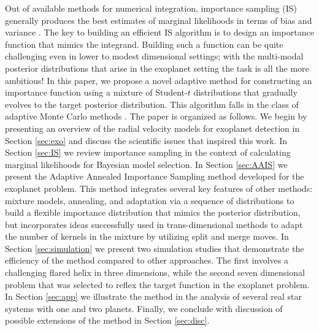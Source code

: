 Out of available methods for numerical integration, importance
sampling (IS) generally produces the best estimates of marginal
likelihoods in terms of bias and variance . The key to building an efficient IS algorithm is to
design an importance function that mimics the integrand.  Building
such a function can be quite challenging even in lower to modest
dimensional settings; with the multi-modal posterior distributions
that arise in the exoplanet setting the task is all the more
ambitious!  In this paper, we propose a novel adaptive method for
constructing an importance function using a mixture of Student-$t$
distributions that gradually evolves to the target posterior
distribution.  This algorithm falls in the class of adaptive  Monte
Carlo methods \citep[see][for an overview and papers appearing in the
special issue on sequential Monte Carlo]{fern:2008}.  The paper is organized as
follows.   We begin by
presenting an overview of the radial velocity models for exoplanet
detection in Section \ref{sec:exo} and discuss the scientific issues
that inspired this work. In Section \ref{sec:IS} we review importance
sampling in the context of calculating marginal likelihoods for
Bayesian model selection. In Section \ref{sec:AAIS} we present the
Adaptive Annealed Importance Sampling method developed for the
exoplanet problem. This method integrates several key features of
other methods: mixture models, annealing, and adaptation via a
sequence of distributions to build a flexible importance distribution
that mimics the posterior distribution, but incorporates ideas
successfully used in trans-dimensional methods to adapt the number of
kernels in the mixture by utilizing split and merge moves.  In Section
\ref{sec:simulation} we present two simulation studies that
demonstrate the efficiency of the method compared to other approaches.
The first involves a challenging flared helix in three dimensions,
while the second seven dimensional problem that was selected to reflex
the target function in the exoplanet problem.  In Section
\ref{sec:app} we illustrate the method in the analysis of several real
star systems with one and two planets. Finally, we conclude with
discussion of possible extensions of the method in Section
\ref{sec:disc}.
